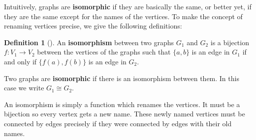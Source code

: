 \documentclass[10pt,]{book}
\newcommand{\terminology}[1]{\textbf{#1}}
\theoremstyle{plain}
\theoremstyle{definition}
\newtheorem{definition}[theorem]{Definition}
\theoremstyle{definition}
\theoremstyle{definition}
\numberwithin{equation}{chapter}
\def\isom{\cong}
\begin{document}
\hypertarget{p-1284}{}%
Intuitively, graphs are \terminology{isomorphic}  if they are basically the same, or better yet, if they are the same except for the names of the vertices. To make the concept of renaming vertices precise, we give the following definitions:%
\begin{definition}[{}]\label{definition-4}
\hypertarget{p-1285}{}%
 An \terminology{isomorphism} between two graphs \(G_1\) and \(G_2\) is a bijection \(f:V_1 \to V_2\) between the vertices of the graphs such that \(\{a,b\}\) is an edge in \(G_1\) if and only if \(\{f(a), f(b)\}\) is an edge in \(G_2\).%
\par
\hypertarget{p-1286}{}%
Two graphs are \terminology{isomorphic} if there is an isomorphism between them. In this case we write \(G_1 \isom G_2\).%
\end{definition}
\hypertarget{p-1287}{}%
An isomorphism is simply a function which renames the vertices. It must be a bijection so every vertex gets a new name. These newly named vertices must be connected by edges precisely if they were connected by edges with their old names.%
\end{document}
